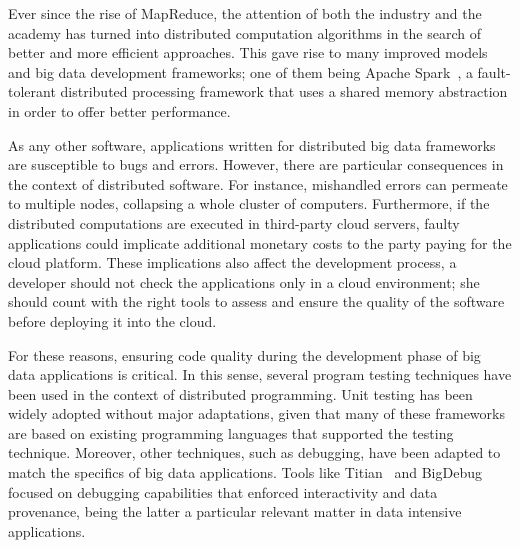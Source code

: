 Ever since the rise of MapReduce, the attention of both the industry and the academy has turned into distributed computation algorithms in the search of better and more efficient approaches. This gave rise to many improved models and big data development frameworks; one of them being Apache Spark~\cite{Zaharia2012a}, a fault-tolerant distributed processing framework that uses a shared memory abstraction in order to offer better performance.






As any other software, applications written for distributed big data frameworks are susceptible to bugs and errors. However, there are particular consequences in the context of distributed software. For instance, mishandled errors can permeate to multiple nodes, collapsing a whole cluster of computers. Furthermore, if the distributed computations are executed in third-party cloud servers, faulty applications could implicate additional monetary costs to the party paying for the cloud platform. These implications also affect the development process, a developer should not check the applications only in a cloud environment; she should count with the right tools to assess and ensure the quality of the software before deploying it into the cloud.

For these reasons, ensuring code quality during the development phase of big data applications is critical. In this sense, several program testing techniques have been used in the context of distributed programming. Unit testing has been widely adopted without major adaptations, given that many of these frameworks are based on existing programming languages that supported the testing technique. Moreover, other techniques, such as debugging, have been adapted to match the specifics of big data applications. Tools like Titian~\cite{Interlandi2015} and BigDebug~\cite{Gulzar2016} focused on debugging capabilities that enforced interactivity and data provenance, being the latter a particular relevant matter in data intensive applications.

